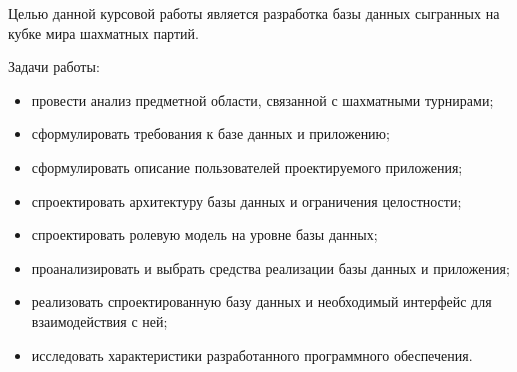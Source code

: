 
Целью данной курсовой работы является разработка базы данных сыгранных на кубке мира шахматных партий.

Задачи работы:
\begin{itemize}
	\item провести анализ предметной области, связанной с шахматными турнирами;
	\item сформулировать требования к базе данных и приложению;
	\item сформулировать описание пользователей проектируемого приложения;
	\item спроектировать архитектуру базы данных и ограничения целостности;
	\item спроектировать ролевую модель на уровне базы данных;
	\item проанализировать и выбрать средства реализации базы данных и приложения;
	\item реализовать спроектированную базу данных и необходимый интерфейс для взаимодействия с ней;
	\item исследовать характеристики разработанного программного обеспечения.
\end{itemize}

\clearpage
